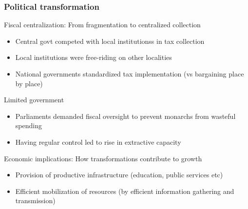 \documentclass[aspectratio=169]{beamer}
\begin{document}
\begin{frame}
\frametitle{Political transformation}
Fiscal centralization: From fragmentation to centralized collection
\begin{itemize}\setlength\itemsep{3pt}
\item Central govt competed with local institutionss in tax collection
\item Local institutions were free-riding on other localities
\item National governments standardized tax implementation (vs bargaining place by place) 
\end{itemize}\medskip
Limited government
\begin{itemize}\setlength\itemsep{3pt}
\item Parliaments demanded fiscal oversight to prevent monarchs from wasteful spending
\item Having regular control led to rise in extractive capacity
\end{itemize}\medskip
Economic implications: How transformations contribute to growth
\begin{itemize}\setlength\itemsep{3pt}
\item Provision of productive infrastructure (education, public services etc)
\item Efficient mobilization of resources (by efficient information gathering and transmission)
\end{itemize}
\end{frame}
\end{document}
